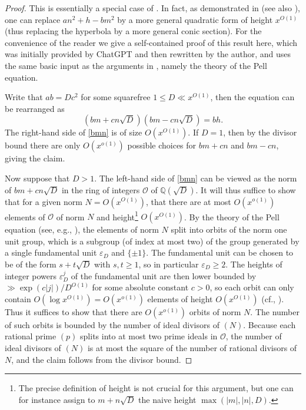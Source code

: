 \documentclass[12pt]{amsart}
\newcommand{\eps}{\varepsilon}
\newcommand{\Q}{\mathbb{Q}}
\begin{document}
\begin{proof}  This is essentially a special case of \cite[Lemma 4]{cilleruelo}.  In fact, as demonstrated in \cite[Proposition 1]{cilleruelo} (see also \cite{vaughan-wooley}), one can replace $an^2+h-bm^2$ by a more general quadratic form of height $x^{O(1)}$ (thus replacing the hyperbola by a more general conic section). For the convenience of the reader we give a self-contained proof of this result here, which was initially provided by ChatGPT and then rewritten by the author, and uses the same basic input as the arguments in \cite{cilleruelo}, namely the theory of the Pell equation.
    
Write that $ab = Dc^2$ for some squarefree $1 \leq D \ll x^{O(1)}$, then the equation can be rearranged as
\begin{equation}\label{bmn}
(bm+cn\sqrt{D})(bm-cn\sqrt{D}) = bh.
\end{equation}
The right-hand side of \eqref{bmn} is of size $O(x^{O(1)})$. If $D=1$, then by the divisor bound there are only $O(x^{o(1)})$ possible choices for $bm+cn$ and $bm-cn$, giving the claim.

Now suppose that $D>1$.  The left-hand side of \eqref{bmn} can be viewed as the norm of $bm+cn\sqrt{D}$ in the ring of integers ${\mathcal O}$ of $\Q(\sqrt{D})$. It will thus suffice to show that for a given norm $N = O(x^{O(1)})$, that there are at most $O(x^{o(1)})$ elements of ${\mathcal O}$ of norm $N$ and height\footnote{The precise definition of height is not crucial for this argument, but one can for instance assign to $m+n\sqrt{D}$ the naive height $\max(|m|, |n|, D)$.}  $O(x^{O(1)})$.  By the theory of the Pell equation (see, e.g., \cite{pell}), the elements of norm $N$ split into orbits of the norm one unit group, which is a subgroup (of index at most two) of the group generated by a single fundamental unit $\eps_D$ and $\{\pm 1\}$.  The fundamental unit can be chosen to be of the form $s+t\sqrt{D}$ with $s,t \geq 1$, so in particular $\eps_D \geq 2$.  The heights of integer powers $\eps_D^j$ of the fundamental unit are then lower bounded by $\gg \exp(c|j|)/D^{O(1)}$ for some absolute constant $c>0$, so each orbit can only contain $O(\log x^{O(1)}) = O(x^{o(1)})$ elements of height $O(x^{O(1)})$ (cf., \cite[\S 4]{aktas}).  Thus it suffices to show that there are $O(x^{o(1)})$ orbits of norm $N$.  The number of such orbits is bounded by the number of ideal divisors of $(N)$.  Because each rational prime $(p)$ splits into at most two prime ideals in $\mathcal{O}$, the number of ideal divisors of $(N)$ is at most the square of the number of rational divisors of $N$, and the claim follows from the divisor bound.
\end{proof}
\end{document}
